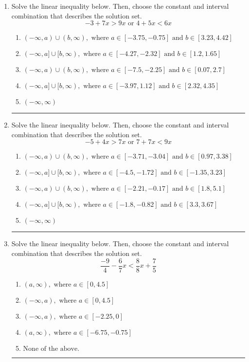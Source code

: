 \documentclass[14pt]{extbook}
\newcommand{\litem}[1]{\item#1\hspace*{-1cm}\rule{\textwidth}{0.4pt}}
\begin{document}
\begin{enumerate}
{\begin{enumerate}[label=\Alph*.]
\end{enumerate} }
\litem{
Solve the linear inequality below. Then, choose the constant and interval combination that describes the solution set.\[ -3 + 7 x > 9 x \text{ or } 4 + 5 x < 6 x \]\begin{enumerate}[label=\Alph*.]
\item \( (-\infty, a) \cup (b, \infty), \text{ where } a \in [-3.75, -0.75] \text{ and } b \in [3.23, 4.42] \)
\item \( (-\infty, a] \cup [b, \infty), \text{ where } a \in [-4.27, -2.32] \text{ and } b \in [1.2, 1.65] \)
\item \( (-\infty, a) \cup (b, \infty), \text{ where } a \in [-7.5, -2.25] \text{ and } b \in [0.07, 2.7] \)
\item \( (-\infty, a] \cup [b, \infty), \text{ where } a \in [-3.97, 1.12] \text{ and } b \in [2.32, 4.35] \)
\item \( (-\infty, \infty) \)

\end{enumerate} }
\litem{
Solve the linear inequality below. Then, choose the constant and interval combination that describes the solution set.\[ -5 + 4 x > 7 x \text{ or } 7 + 7 x < 9 x \]\begin{enumerate}[label=\Alph*.]
\item \( (-\infty, a) \cup (b, \infty), \text{ where } a \in [-3.71, -3.04] \text{ and } b \in [0.97, 3.38] \)
\item \( (-\infty, a] \cup [b, \infty), \text{ where } a \in [-4.5, -1.72] \text{ and } b \in [-1.35, 3.23] \)
\item \( (-\infty, a) \cup (b, \infty), \text{ where } a \in [-2.21, -0.17] \text{ and } b \in [1.8, 5.1] \)
\item \( (-\infty, a] \cup [b, \infty), \text{ where } a \in [-1.8, -0.82] \text{ and } b \in [3.3, 3.67] \)
\item \( (-\infty, \infty) \)

\end{enumerate} }
\litem{
Solve the linear inequality below. Then, choose the constant and interval combination that describes the solution set.\[ \frac{-9}{4} - \frac{6}{7} x < \frac{8}{8} x + \frac{7}{5} \]\begin{enumerate}[label=\Alph*.]
\item \( (a, \infty), \text{ where } a \in [0, 4.5] \)
\item \( (-\infty, a), \text{ where } a \in [0, 4.5] \)
\item \( (-\infty, a), \text{ where } a \in [-2.25, 0] \)
\item \( (a, \infty), \text{ where } a \in [-6.75, -0.75] \)
\item \( \text{None of the above}. \)


\end{enumerate}}
\end{enumerate}
\end{document}

